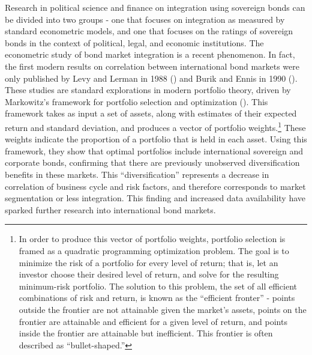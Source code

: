 \documentclass[3p]{elsarticle}
\begin{document}
Research in political science and finance on integration using sovereign bonds can be divided into two groups - one that focuses on integration as measured by standard econometric models, and one that focuses on the ratings of sovereign bonds in the context of political, legal, and economic institutions.  The econometric study of bond market integration is a recent phenomenon.  In fact, the first modern results on correlation between international bond markets were only published by Levy and Lerman in 1988 (\cite{Levy1988}) and Burik and Ennis in 1990 (\cite{Burik1990}).  These studies are standard explorations in modern portfolio theory, driven by Markowitz's framework for portfolio selection and optimization (\cite{Markowitz1959}).  This framework takes as input a set of assets, along with estimates of their expected return and standard deviation, and produces a vector of portfolio weights.\footnote{In order to produce this vector of portfolio weights, portfolio selection is framed as a quadratic programming optimization problem.  The goal is to minimize the risk of a portfolio for every level of return; that is, let an investor choose their desired level of return, and solve for the resulting minimum-risk portfolio.  The solution to this problem, the set of all efficient combinations of risk and return, is known as the ``efficient fronter'' - points outside the frontier are not attainable given the market's assets, points on the frontier are attainable and efficient for a given level of return, and points inside the frontier are attainable but inefficient.  This frontier is often described as ``bullet-shaped.''}  These weights indicate the proportion of a portfolio that is held in each asset.  Using this framework, they show that optimal portfolios include international sovereign and corporate bonds, confirming that there are previously unobserved diversification benefits in these markets.  This ``diversification'' represents a decrease in correlation of business cycle and risk factors, and therefore corresponds to market segmentation or less integration.  This finding and increased data availability have sparked further research into international bond markets.
\end{document}
